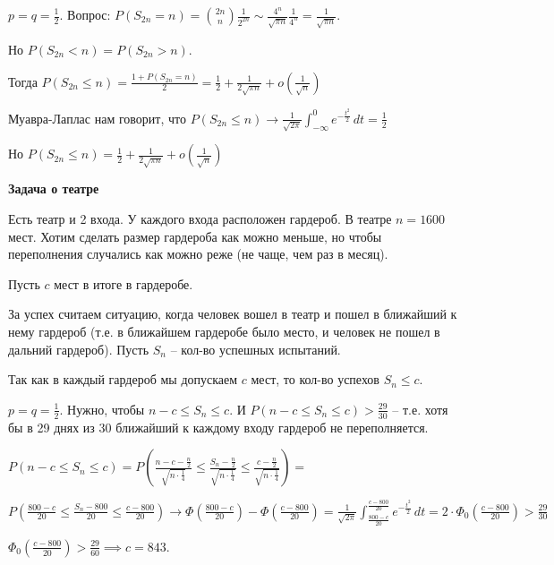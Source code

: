\begin{example}
    $p = q = \frac{1}{2}$. Вопрос: $P(S_{2n} = n) = \binom{2n}{n} \frac{1}{2^{2n}} \sim
    \frac{4^n}{\sqrt{\pi n}} \frac{1}{4^n} = \frac{1}{\sqrt{\pi n}}$.

    Но $P(S_{2n} < n) = P(S_{2n} > n)$.

    Тогда $P(S_{2n} \leqslant n) = \frac{1 + P(S_{2n} = n)}{2} = \frac{1}{2} + \frac{1}{2\sqrt{\pi n}} + o(\frac{1}{\sqrt{n}})$

    Муавра-Лаплас нам говорит, что $P(S_{2n} \leqslant n) \to \frac{1}{\sqrt{2\pi}} \int_{-\infty}^0 e^{-\frac{t^2}{2}} \, dt = \frac{1}{2}$

    Но $P(S_{2n} \leqslant n) = \frac{1}{2} + \frac{1}{2\sqrt{\pi n}} + o(\frac{1}{\sqrt{n}})$
\end{example}

\begin{example}
    \textbf{Задача о театре}

    Есть театр и 2 входа. У каждого входа расположен гардероб.
    В театре $n = 1600$ мест. Хотим сделать размер гардероба как можно меньше, но чтобы
    переполнения случались как можно реже (не чаще, чем раз в месяц).

    Пусть $c$ мест в итоге в гардеробе.

    За успех считаем ситуацию, когда человек вошел в театр и пошел в ближайший к нему гардероб (т.е. в ближайшем гардеробе было место, и человек не пошел в дальний гардероб). Пусть $S_n$ -- кол-во успешных испытаний.

    Так как в каждый гардероб мы допускаем $c$ мест, то кол-во успехов $S_n \leq c$.

    $p = q = \frac{1}{2}$. Нужно, чтобы $n - c \leqslant S_n \leqslant c$. И $P(n - c \leqslant S_n \leqslant c) > \frac{29}{30}$ -- т.е. хотя бы в 29 днях из 30 ближайший к каждому входу гардероб не переполняется.

    $P(n - c \leqslant S_n \leqslant c) = P\left(\frac{n - c - \frac{n}{2}}{\sqrt{n \cdot \frac{1}{4}}}
    \leqslant \frac{S_n - \frac{n}{2}}{\sqrt{n \cdot \frac{1}{4}}} \leqslant \frac{c - \frac{n}{2}}{\sqrt{n \cdot \frac{1}{4}}}\right) =$


    $P\left(\frac{800 - c}{20} \leqslant \frac{S_n - 800}{20} \leqslant \frac{c - 800}{20}\right) \to \Phi (\frac{800 - c}{20}) - \Phi (\frac{c - 800}{20}) =
    \frac{1}{\sqrt{2\pi}} \int_{\frac{800 - c}{20}}^{\frac{c - 800}{20}} e^{-\frac{t^2}{2}} \, dt = 2 \cdot \Phi_0(\frac{c - 800}{20}) > \frac{29}{30}$

    $\Phi_0 (\frac{c - 800}{20}) > \frac{29}{60} \implies c = 843$.

\end{example}

